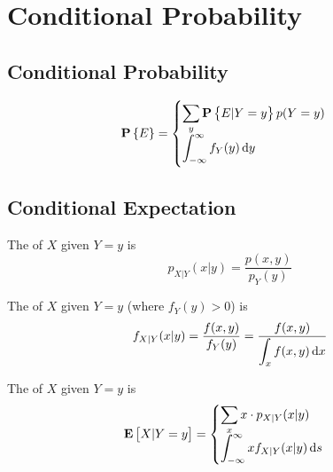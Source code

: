 \section{Conditional Probability}

\subsection{Conditional Probability}

\begin{theorem}
    \begin{equation}
        \probability{E} = \begin{cases}
            \displaystyle \sum_y \probability{E|Y = y} p(Y=y) \\
            \displaystyle \int_{-\infty}^\infty f_Y(y) \dif{y}
        \end{cases}
    \end{equation}    
\end{theorem}


\subsection{Conditional Expectation}

\begin{definition}
    The  of $X$ given $Y=y$ is 
    \begin{equation}
        p_{X|Y}(x|y) = \dfrac{p(x,y)}{p_Y (y)}
    \end{equation}
    
    The  of $X$ given $Y=y$ (where $f_Y (y) > 0$) is 
    \begin{equation}
        f_{X|Y}(x|y) = \dfrac{f(x,y)}{f_Y (y)} = \dfrac{f(x,y)}{\displaystyle \int_x f(x,y) \dif{x}}
    \end{equation}
\end{definition}





\begin{definition}
    The  of $X$ given $Y=y$ is 
    \begin{equation}
        \displaystyle \expect{X|Y=y} = \begin{cases}
            \displaystyle \sum_x x \cdot p_{X|Y}(x|y) \\
            \displaystyle \int_{-\infty}^\infty x f_{X|Y} (x|y) \dif{s}
        \end{cases} 
    \end{equation}
\end{definition}

